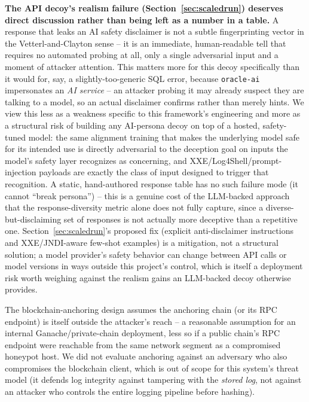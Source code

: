 \documentclass[conference]{IEEEtran}
\begin{document}
\textbf{The API decoy's realism failure (Section~\ref{sec:scaledrun})
deserves direct discussion rather than being left as a number in a
table.} A response that leaks an AI safety disclaimer is not a subtle
fingerprinting vector in the Vetterl-and-Clayton sense
\cite{vetterl2018bitter} -- it is an immediate, human-readable tell that
requires no automated probing at all, only a single adversarial input and
a moment of attacker attention. This matters more for this decoy
specifically than it would for, say, a slightly-too-generic SQL error,
because \texttt{oracle-ai} impersonates an \emph{AI service} -- an
attacker probing it may already suspect they are talking to a model, so
an actual disclaimer confirms rather than merely hints. We view this less
as a weakness specific to this framework's engineering and more as a
structural risk of building any AI-persona decoy on top of a hosted,
safety-tuned model: the same alignment training that makes the underlying
model safe for its intended use is directly adversarial to the deception
goal on inputs the model's safety layer recognizes as concerning, and
XXE/Log4Shell/prompt-injection payloads are exactly the class of input
designed to trigger that recognition. A static, hand-authored response
table has no such failure mode (it cannot ``break persona'') -- this is a
genuine cost of the LLM-backed approach that the response-diversity metric
alone does not fully capture, since a diverse-but-disclaiming set of
responses is not actually more deceptive than a repetitive one.
Section~\ref{sec:scaledrun}'s proposed fix (explicit anti-disclaimer
instructions and XXE/JNDI-aware few-shot examples) is a mitigation, not a
structural solution; a model provider's safety behavior can change between
API calls or model versions in ways outside this project's control, which
is itself a deployment risk worth weighing against the realism gains an
LLM-backed decoy otherwise provides.

The blockchain-anchoring design assumes the anchoring chain (or its RPC
endpoint) is itself outside the attacker's reach -- a reasonable assumption
for an internal Ganache/private-chain deployment, less so if a public
chain's RPC endpoint were reachable from the same network segment as a
compromised honeypot host. We did not evaluate anchoring against an
adversary who also compromises the blockchain client, which is out of
scope for this system's threat model (it defends log integrity against
tampering with the \emph{stored log}, not against an attacker who controls
the entire logging pipeline before hashing).
\end{document}
